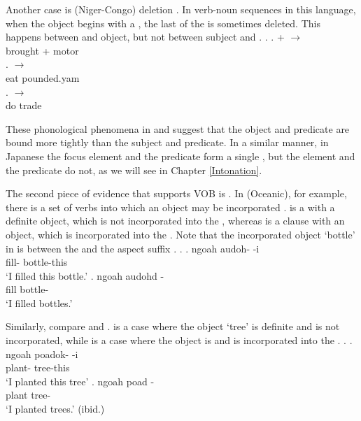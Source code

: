 Another case is  (Niger-Congo)  deletion \cite[from][]{bamgbose64}.
In verb-noun sequences in this language,
when the object begins with a ,
the last  of the  is sometimes deleted.
This happens between  and object, but not between subject and .
%
\ex.
 \ag.  +  $\to$  \\
		brought + motor \\
 \bg.   $\to$  \\
 		eat pounded.yam \\
 \bg.   $\to$  \\
 		do trade \\
		\hfill{\cite[][pp.~29--30]{bamgbose64}}

These phonological phenomena in  and  suggest that
the object and predicate are bound more tightly than the subject and predicate.
In a similar manner,
in Japanese
the focus element and the predicate form a single ,
but the  element and the predicate do not,
as we will see in Chapter \ref{Intonation}.

The second piece of evidence that supports VOB is .
In  (Oceanic), for example,
there is a set of verbs into which an  object may be incorporated \cite[from][]{harrison76}.
\Next[a] is a  with a definite object,
which is not incorporated into the ,
whereas \Next[b] is a clause with an  object,
which is incorporated into the .
Note that the incorporated object  `bottle' in \Next[b] is between the  and the aspect suffix .
%
\ex.
 \ag. ngoah audoh- -i \\
		 fill- bottle-this \\
		`I filled this bottle.'
 \bg. ngoah audohd - \\
		 fill bottle- \\
		`I filled bottles.'
		\hfill{\cite[162]{harrison76}}

Similarly,
compare \Next[a] and \Next[b].
\Next[a] is a case where the object  `tree' is definite and is not incorporated,
while \Next[b] is a case where the object is  and is incorporated into the .
\ex.
 \ag. ngoah poadok- -i \\
 	 plant- tree-this \\
	`I planted this tree'
 \bg. ngoah poad - \\
 	 plant tree- \\
	`I planted trees.'
	\hfill{(ibid.)}

